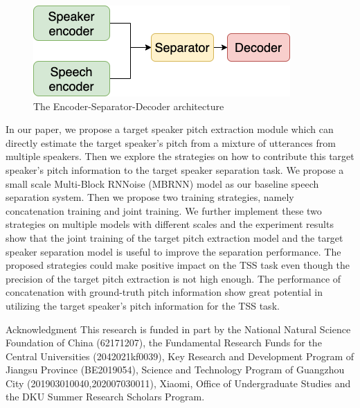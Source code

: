 \documentclass[final]{beamer}
\newlength{\colwidth}
\begin{document}
\begin{frame}[t]
\begin{columns}[t]
\begin{column}{\colwidth}
\begin{block}{}
                    \begin{figure}[!t]
                        \centering
                        \includegraphics[width=0.58\linewidth]{img/encoder_sep_decoder}
                        \caption{The Encoder-Separator-Decoder architecture}
                        \label{fig:enc_sep_doc_arc}
                    \end{figure}

                    In our paper, we propose a target speaker pitch extraction module which can directly estimate the target speaker's pitch from a mixture of utterances from multiple speakers.
                    Then we explore the strategies on how to contribute this target speaker's pitch information to the target speaker separation task.
                    We propose a small scale Multi-Block RNNoise (MBRNN) model as our baseline speech separation system.
                    Then we propose two training strategies, namely concatenation training and joint training.
                    We further implement these two strategies on multiple models with different scales and the experiment results show that the joint training of the target pitch extraction model and the target speaker separation model is useful to improve the separation performance.
                    The proposed strategies could make positive impact on the TSS task even though the precision of the target pitch extraction is not high enough.
                    The performance of concatenation with ground-truth pitch information show great potential in utilizing the target speaker's pitch information for the TSS task.
                \end{block}

                \begin{block}{Acknowledgment}
                    This research is funded in part by the National Natural Science Foundation of China (62171207), the Fundamental Research Funds for the Central Universities (2042021kf0039), Key Research and Development Program of Jiangsu Province (BE2019054), Science and Technology Program of Guangzhou City (201903010040,202007030011), Xiaomi, Office of Undergraduate Studies and the DKU Summer Research Scholars Program.
                \end{block}


\end{column}
\end{columns}
\end{frame}
\end{document}
